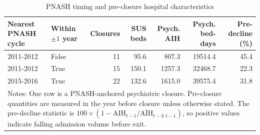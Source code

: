 \begin{table}[!htbp]\centering
\caption{PNASH timing and pre-closure hospital characteristics}
\label{tab:pnash-event-timing}
\small
\begin{tabular}{llrrrrr}
\toprule
Nearest PNASH cycle & Within $\pm 1$ year & Closures & SUS beds & Psych. AIH & Psych. bed-days & Pre-decline (\%) \\
\midrule
2011-2012 & False & 11 & 95.6 & 807.3 & 19514.4 & 45.4 \\
2011-2012 & True & 15 & 150.1 & 1257.3 & 32468.7 & 22.3 \\
2015-2016 & True & 22 & 132.6 & 1615.0 & 39575.4 & 31.8 \\
\bottomrule
\multicolumn{7}{p{0.92\textwidth}}{\footnotesize Notes: One row is a PNASH-anchored psychiatric closure. Pre-closure quantities are measured in the year before closure unless otherwise stated. The pre-decline statistic is $100\times(1-\mathrm{AIH}_{t-1}/\overline{\mathrm{AIH}}_{t-3:t-1})$, so positive values indicate falling admission volume before exit.}\\
\end{tabular}
\end{table}

